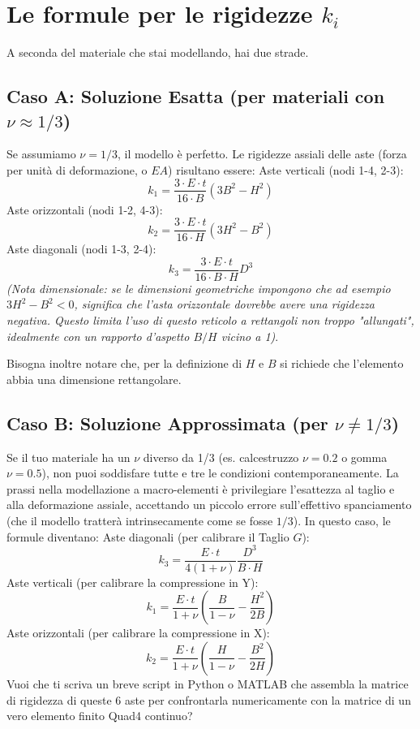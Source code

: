 \documentclass[a4paper]{article}
\begin{document}
\section{Le formule per le rigidezze $k_i$}

A seconda del materiale che stai modellando, hai due strade.

\subsection{Caso A: Soluzione Esatta (per materiali con $\nu \approx 1/3$)}

Se assumiamo $\nu = 1/3$, il modello è perfetto. Le rigidezze assiali delle aste (forza per unità di deformazione, o $EA$) risultano essere:
Aste verticali (nodi 1-4, 2-3):
$$k_1 = \frac{3 \cdot E \cdot t}{16 \cdot B} (3B^2 - H^2)$$
Aste orizzontali (nodi 1-2, 4-3):
$$k_2 = \frac{3 \cdot E \cdot t}{16 \cdot H} (3H^2 - B^2)$$
Aste diagonali (nodi 1-3, 2-4):
$$k_3 = \frac{3 \cdot E \cdot t}{16 \cdot B \cdot H} D^3$$
\textit{(Nota dimensionale: se le dimensioni geometriche impongono che ad esempio $3H^2 - B^2 < 0$, significa che l'asta orizzontale dovrebbe avere una rigidezza negativa. Questo limita l'uso di questo reticolo a rettangoli non troppo "allungati", idealmente con un rapporto d'aspetto $B/H$ vicino a 1)}.

Bisogna inoltre notare che, per la definizione di $H$ e $B$ si richiede che l'elemento abbia una dimensione rettangolare.


\subsection{Caso B: Soluzione Approssimata (per $\nu \neq 1/3$)}

Se il tuo materiale ha un $\nu$ diverso da 1/3 (es. calcestruzzo $\nu=0.2$ o gomma $\nu=0.5$), non puoi soddisfare tutte e tre le condizioni contemporaneamente. La prassi nella modellazione a macro-elementi è privilegiare l'esattezza al taglio e alla deformazione assiale, accettando un piccolo errore sull'effettivo spanciamento (che il modello tratterà intrinsecamente come se fosse $1/3$).
In questo caso, le formule diventano:
Aste diagonali (per calibrare il Taglio $G$):
$$k_3 = \frac{E \cdot t}{4(1+\nu)} \frac{D^3}{B \cdot H}$$
Aste verticali (per calibrare la compressione in Y):
$$k_1 = \frac{E \cdot t}{1+\nu} \left( \frac{B}{1-\nu} - \frac{H^2}{2B} \right)$$
Aste orizzontali (per calibrare la compressione in X):
$$k_2 = \frac{E \cdot t}{1+\nu} \left( \frac{H}{1-\nu} - \frac{B^2}{2H} \right)$$
Vuoi che ti scriva un breve script in Python o MATLAB che assembla la matrice di rigidezza di queste 6 aste per confrontarla numericamente con la matrice di un vero elemento finito Quad4 continuo?
\end{document}
